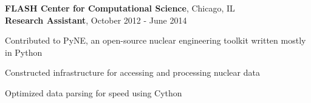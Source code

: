 \textbf{FLASH Center for Computational Science}, Chicago, IL \\
\textbf{Research Assistant}, October 2012 - June 2014
\begin{tightlist}

  \item Contributed to PyNE, an open-source nuclear engineering
    toolkit written mostly in Python

  \item Constructed infrastructure for accessing and processing nuclear data

  \item Optimized data parsing for speed using Cython

\end{tightlist}
